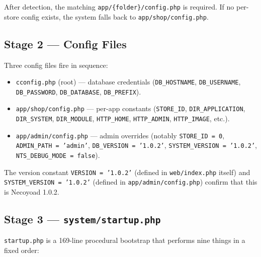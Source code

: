 \documentclass[11pt,a4paper]{article}
\begin{document}
After detection, the matching \texttt{app/\{folder\}/config.php} is
required. If no per-store config exists, the system falls back to
\texttt{app/shop/config.php}.

\subsection{Stage 2 --- Config Files}

Three config files fire in sequence:

\begin{itemize}[leftmargin=1.6em,itemsep=2pt]
  \item \texttt{cconfig.php} (root) --- database credentials
        (\texttt{DB\_HOSTNAME}, \texttt{DB\_USERNAME},
        \texttt{DB\_PASSWORD}, \texttt{DB\_DATABASE},
        \texttt{DB\_PREFIX}).
  \item \texttt{app/shop/config.php} --- per-app constants
        (\texttt{STORE\_ID}, \texttt{DIR\_APPLICATION},
        \texttt{DIR\_SYSTEM}, \texttt{DIR\_MODULE}, \texttt{HTTP\_HOME},
        \texttt{HTTP\_ADMIN}, \texttt{HTTP\_IMAGE}, etc.).
  \item \texttt{app/admin/config.php} --- admin overrides (notably
        \texttt{STORE\_ID = 0}, \texttt{ADMIN\_PATH = 'admin'},
        \texttt{DB\_VERSION = '1.0.2'}, \texttt{SYSTEM\_VERSION =
        '1.0.2'}, \texttt{NTS\_DEBUG\_MODE = false}).
\end{itemize}

The version constant \texttt{VERSION = '1.0.2'} (defined in
\texttt{web/index.php} itself) and \texttt{SYSTEM\_VERSION =
'1.0.2'} (defined in \texttt{app/admin/config.php}) confirm that
this is Necoyoad 1.0.2.

\subsection{Stage 3 --- \texttt{system/startup.php}}

\texttt{startup.php} is a 169-line procedural bootstrap that performs
nine things in a fixed order:
\end{document}
